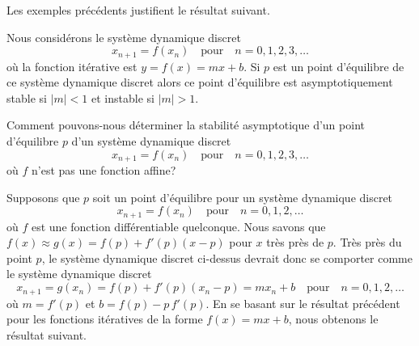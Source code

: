 {%




Les exemples précédents justifient le résultat suivant.

\begin{focus}{\prp}
Nous considérons le système dynamique discret
\[
x_{n+1} = f(x_n) \quad \text{pour} \quad n=0, 1, 2, 3, \ldots
\]
où la fonction itérative est $y=f(x) = m x +b$.  Si $p$ est un point
d'équilibre de ce système dynamique discret alors ce point d'équilibre
est asymptotiquement stable si $|m|<1$ et instable si $|m|>1$.
\end{focus}

Comment pouvons-nous déterminer la stabilité asymptotique d'un point
d'équilibre $p$ d'un système dynamique discret
\[
x_{n+1} = f(x_n) \quad \text{pour} \quad n=0, 1, 2, 3, \ldots
\]
où $f$ n'est pas une fonction affine?

Supposons que $p$ soit un point d'équilibre pour un système dynamique
discret
\[
x_{n+1} = f(x_n) \quad \text{pour} \quad n =0, 1, 2 ,\ldots
\]
où $f$ est une fonction différentiable quelconque.  Nous savons que
$f(x) \approx g(x) = f(p) + f'(p) (x-p)$ pour $x$ très près de $p$.
Très près du point $p$, le système dynamique discret ci-dessus devrait
donc se comporter comme le système dynamique discret
\[
x_{n+1} = g(x_n) = f(p) + f'(p) (x_n-p) = m x_n + b \quad \text{pour} \quad
n=0,1,2,\ldots
\]
où $m = f'(p)$ et $b = f(p) - p\,f'(p)$.  En se basant sur le résultat
précédent pour les fonctions itératives de la forme $f(x) = mx+b$,
nous obtenons le résultat suivant.

}
